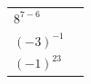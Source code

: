 {\begin{tabular}[t]{|l|l|}
     \tabularnewline\cline{1-1}\cline{2-2}
                  \begin{math}{8}^{7-6}\end{math}
                 &
     \tabularnewline\cline{1-1}\cline{2-2}
                  \begin{math}{\left(-3\right)}^{-1}\end{math}
                 &
     \tabularnewline\cline{1-1}\cline{2-2}
                  \begin{math}{\left(-1\right)}^{23}\end{math}
                 &
     \tabularnewline\cline{1-1}\cline{2-2}
    \end{tabular}} %
        \addtolength{\mytableboxheight}{\mytableboxdepth}
